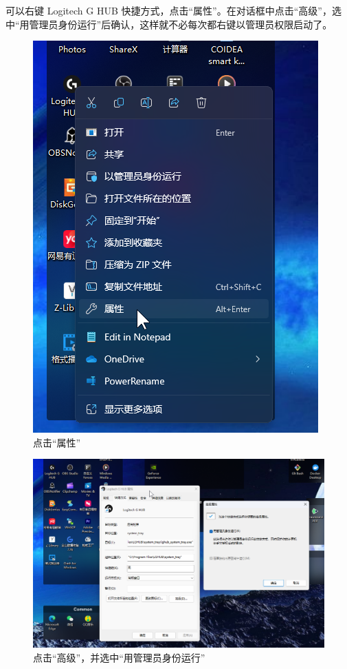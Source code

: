 可以右键 Logitech G HUB 快捷方式，点击“属性”。在对话框中点击“高级”，选中“用管理员身份运行”后确认，这样就不必每次都右键以管理员权限启动了。

\begin{figure}[H]
    \Centering
    \includegraphics[width=\textwidth]{docs/assets/lghub_property.png}
    \caption{点击“属性”}
\end{figure}

\begin{figure}[H]
    \Centering
    \includegraphics[width=\textwidth]{docs/assets/lghub_advanced.png}
    \caption{点击“高级”，并选中“用管理员身份运行”}
\end{figure}

